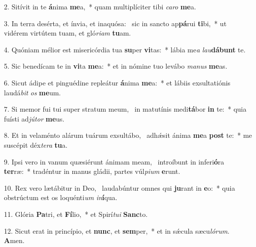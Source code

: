 2. Sitívit in te \textbf{á}nima \textbf{me}a,~*  quam multiplíciter tibi \textit{ca}\textit{ro} \textbf{me}a.\

3. In terra desérta, et ínvia, et inaquósa: \dag\  sic in sancto ap\textbf{pá}rui \textbf{ti}bi,~*  ut vidérem virtútem tuam, et gló\textit{ri}\textit{am} \textbf{tu}am.\

4. Quóniam mélior est misericórdia tua \textbf{su}per \textbf{vi}tas:~*  lábia me\textit{a} \textit{lau}\textbf{dá}\textbf{bunt} te.\

5. Sic benedícam te in \textbf{vi}ta \textbf{me}a:~*  et in nómine tuo levábo \textit{ma}\textit{nus} \textbf{me}as.\

6. Sicut ádipe et pinguédine repleátur \textbf{á}nima \textbf{me}a:~*  et lábiis exsultatiónis laudá\textit{bit} \textit{os} \textbf{me}um.\

7. Si memor fui tui super stratum meum, \dag\  in matutínis medi\textbf{tá}bor \textbf{in} te:~*  quia fuísti ad\textit{jú}\textit{tor} \textbf{me}us.\

8. Et in velaménto alárum tuárum exsultábo, \dag\  adhǽsit ánima \textbf{me}a \textbf{post} te:~*  me suscépit déx\textit{te}\textit{ra} \textbf{tu}a.\

9. Ipsi vero in vanum quæsiérunt ánimam meam, \dag\  introíbunt in inferi\textbf{ó}ra \textbf{ter}ræ:~*  tradéntur in manus gládii, partes vúl\textit{pi}\textit{um} \textbf{e}runt.\

10. Rex vero lætábitur in Deo, \dag\  laudabúntur omnes qui \textbf{ju}rant in \textbf{e}o:~*  quia obstrúctum est os loquénti\textit{um} \textit{in}\textbf{í}qua.\

11. Glória \textbf{Pa}tri, et \textbf{Fí}lio,~*  et Spirí\textit{tu}\textit{i} \textbf{Sanc}to.\

12. Sicut erat in princípio, et \textbf{nunc}, et \textbf{sem}per,~*  et in sǽcula sæcu\textit{ló}\textit{rum}. \textbf{A}men.\

